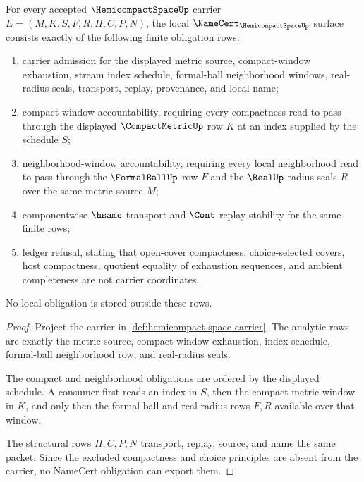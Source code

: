 \begin{theorem}
\label{thm:hemicompact-space-namecert-obligations}
For every accepted $\HemicompactSpaceUp$ carrier $E=(M,K,S,F,R,H,C,P,N)$, the local $\NameCert_{\HemicompactSpaceUp}$ surface consists exactly of the following finite obligation rows:
\begin{enumerate}
\item carrier admission for the displayed metric source, compact-window exhaustion, stream index schedule, formal-ball neighborhood windows, real-radius seals, transport, replay, provenance, and local name;
\item compact-window accountability, requiring every compactness read to pass through the displayed $\CompactMetricUp$ row $K$ at an index supplied by the schedule $S$;
\item neighborhood-window accountability, requiring every local neighborhood read to pass through the $\FormalBallUp$ row $F$ and the $\RealUp$ radius seals $R$ over the same metric source $M$;
\item componentwise $\hsame$ transport and $\Cont$ replay stability for the same finite rows;
\item ledger refusal, stating that open-cover compactness, choice-selected covers, host compactness, quotient equality of exhaustion sequences, and ambient completeness are not carrier coordinates.
\end{enumerate}
No local obligation is stored outside these rows.
\end{theorem}
\begin{proof}
Project the carrier in \autoref{def:hemicompact-space-carrier}. The analytic rows are exactly the metric source, compact-window exhaustion, index schedule, formal-ball neighborhood row, and real-radius seals.

The compact and neighborhood obligations are ordered by the displayed schedule. A consumer first reads an index in $S$, then the compact metric window in $K$, and only then the formal-ball and real-radius rows $F,R$ available over that window.

The structural rows $H,C,P,N$ transport, replay, source, and name the same packet. Since the excluded compactness and choice principles are absent from the carrier, no NameCert obligation can export them.
\end{proof}

